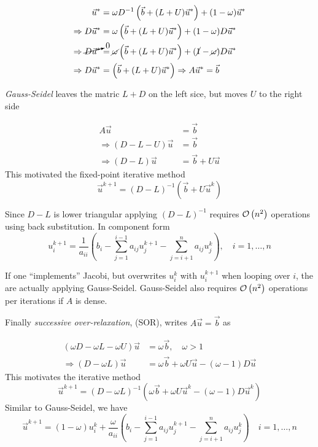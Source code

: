 \begin{align*}
\vec{u}^* &= \omega D^{-1}\left(\vec{b}+(L +U)\vec{u}^*\right) + (1-\omega)\vec{u}^* \\
\Rightarrow D\vec{u}^* &= \omega \left(\vec{b}+(L +U)\vec{u}^*\right) + (1-\omega)D\vec{u}^* \\
\Rightarrow \cancelto{0}{D\vec{u}^*} &= \cancel{\omega} \left(\vec{b}+(L +U)\vec{u}^*\right) + (\cancel{1}-\cancel{\omega})D\vec{u}^* \\
\Rightarrow D\vec{u}^* &= \left(\vec{b}+(L +U)\vec{u}^*\right) \Rightarrow A\vec{u}^*=\vec{b}
\end{align*}

\emph{Gauss-Seidel} leaves the matric $L+D$ on the left sice, but moves $U$ to the
right side

\begin{align*}
  A\vec{u} &= \vec{b}\\
\Rightarrow (D-L-U)\vec{u} &= \vec{b}\\
\Rightarrow (D-L)\vec{u} &= \vec{b}+U\vec{u}
\end{align*}
This motivated the fixed-point iterative method
\begin{equation*}
  \vec{u}^{k+1} = (D-L)^{-1} \left(\vec{b}+U\vec{u}^k \right)
\end{equation*}

Since $D-L$ is lower triangular applying $(D-L)^{-1}$ requires $\mathcal{O}\left(n^2\right)$
operations using back substitution. In component form 
\begin{equation*}
  u_i^{k+1} = \frac{1}{a_{ii}} \left(b_i
    - \sum_{j=1}^{i-1}a_{ij}u_j^{k+1}
    - \sum_{j=i+1}^{n}a_{ij}u_j^{k}
  \right),
  \quad i=1, \ldots, n
\end{equation*}

If one ``implements'' Jacobi, but overwrites $u_i^k$ with $u_i^{k+1}$ when
looping over $i$, the are actually applying Gauss-Seidel. Gauss-Seidel also
requires $\mathcal{O}\left(n^2\right)$ operations per iterations if $A$ is dense.

Finally \emph{successive over-relaxation}, (SOR), writes $A\vec{u}=\vec{b}$ as

\begin{align*}
  \left( \omega D - \omega L - \omega U \right) \vec{u} &= \omega \vec{b}
                                                          , \quad \omega > 1\\
  \Rightarrow \left( D - \omega L \right) \vec{u} &= \omega \vec{b}
          + \omega U \vec{u} - (\omega-1)D\vec{u}
\end{align*}
This motivates the iterative method
\begin{equation*}
  \vec{u}^{k+1} = \left( D - \omega L \right)^{-1}\left(  \omega \vec{b}
          + \omega U \vec{u}^k - (\omega-1)D\vec{u}^k\right)
\end{equation*}
Similar to Gauss-Seidel, we have
\begin{equation*}
  \vec{u}^{k+1} = (1-\omega)u_i^k+\frac{\omega}{a_{ii}}
  \left(
    b_i - \sum_{j=1}^{i-1}a_{ij}u_j^{k+1} - \sum_{j=i+1}^na_{ij}u_j^k
  \right) \quad i=1, \ldots, n
\end{equation*}

